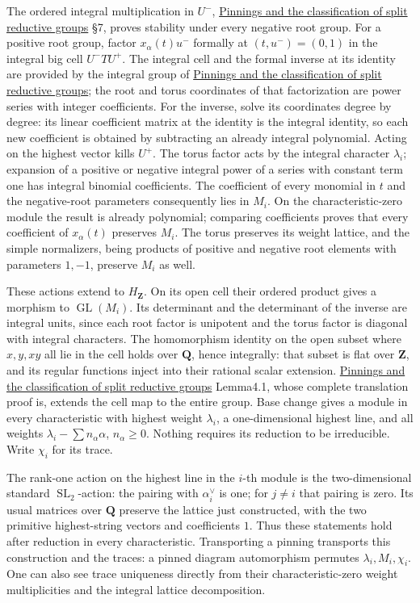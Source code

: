 \documentclass[
  11pt,
]{article}
\begin{document}
The ordered integral multiplication in \(U^-\),
\href{../AG-RG/AG-RG-05.html}{Pinnings and the classification of split
reductive groups} §7, proves stability under every negative root group.
For a positive root group, factor \(x_\alpha(t)u^-\) formally at
\((t,u^-)=(0,1)\) in the integral big cell \(U^-TU^+\). The integral
cell and the formal inverse at its identity are provided by the integral
group of \href{../AG-RG/AG-RG-05.html}{Pinnings and the classification
of split reductive groups}; the root and torus coordinates of that
factorization are power series with integer coefficients. For the
inverse, solve its coordinates degree by degree: its linear coefficient
matrix at the identity is the integral identity, so each new coefficient
is obtained by subtracting an already integral polynomial. Acting on the
highest vector kills \(U^+\). The torus factor acts by the integral
character \(\lambda_i\); expansion of a positive or negative integral
power of a series with constant term one has integral binomial
coefficients. The coefficient of every monomial in \(t\) and the
negative-root parameters consequently lies in \(M_i\). On the
characteristic-zero module the result is already polynomial; comparing
coefficients proves that every coefficient of \(x_\alpha(t)\) preserves
\(M_i\). The torus preserves its weight lattice, and the simple
normalizers, being products of positive and negative root elements with
parameters \(1,-1\), preserve \(M_i\) as well.

These actions extend to \(H_{\mathbf Z}\). On its open cell their
ordered product gives a morphism to \(\operatorname{GL}(M_i)\). Its
determinant and the determinant of the inverse are integral units, since
each root factor is unipotent and the torus factor is diagonal with
integral characters. The homomorphism identity on the open subset where
\(x,y,xy\) all lie in the cell holds over \(\mathbf Q\), hence
integrally: that subset is flat over \(\mathbf Z\), and its regular
functions inject into their rational scalar extension.
\href{../AG-RG/AG-RG-05.html}{Pinnings and the classification of split
reductive groups} Lemma4.1, whose complete translation proof is, extends
the cell map to the entire group. Base change gives a module in every
characteristic with highest weight \(\lambda_i\), a one-dimensional
highest line, and all weights \(\lambda_i-\sum n_\alpha\alpha\),
\(n_\alpha\geq0\). Nothing requires its reduction to be irreducible.
Write \(\chi_i\) for its trace.

The rank-one action on the highest line in the \(i\)-th module is the
two-dimensional standard \(\operatorname{SL}_2\)-action: the pairing
with \(\alpha_i^\vee\) is one; for \(j\ne i\) that pairing is zero. Its
usual matrices over \(\mathbf Q\) preserve the lattice just constructed,
with the two primitive highest-string vectors and coefficients \(1\).
Thus these statements hold after reduction in every characteristic.
Transporting a pinning transports this construction and the traces: a
pinned diagram automorphism permutes \(\lambda_i,M_i,\chi_i\). One can
also see trace uniqueness directly from their characteristic-zero weight
multiplicities and the integral lattice decomposition.
\end{document}
